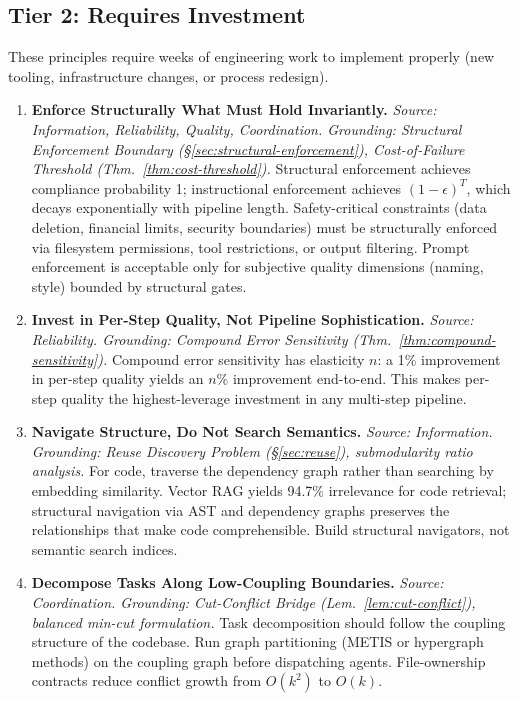 \documentclass[11pt, a4paper, logo, copyright]{googledeepmind}
\begin{document}
\subsection{Tier 2: Requires Investment}
\label{sec:tier2}

These principles require weeks of engineering work to implement properly (new tooling, infrastructure changes, or process redesign).

\begin{enumerate}[label=\textbf{P\arabic*.}, leftmargin=3em, resume]

\item \textbf{Enforce Structurally What Must Hold Invariantly.}
\emph{Source: Information, Reliability, Quality, Coordination. Grounding: Structural Enforcement Boundary (\S\ref{sec:structural-enforcement}), Cost-of-Failure Threshold (Thm.~\ref{thm:cost-threshold}).}
Structural enforcement achieves compliance probability 1; instructional enforcement achieves $(1-\epsilon)^T$, which decays exponentially with pipeline length. Safety-critical constraints (data deletion, financial limits, security boundaries) must be structurally enforced via filesystem permissions, tool restrictions, or output filtering. Prompt enforcement is acceptable only for subjective quality dimensions (naming, style) bounded by structural gates.

\item \textbf{Invest in Per-Step Quality, Not Pipeline Sophistication.}
\emph{Source: Reliability. Grounding: Compound Error Sensitivity (Thm.~\ref{thm:compound-sensitivity}).}
Compound error sensitivity has elasticity $n$: a 1\% improvement in per-step quality yields an $n$\% improvement end-to-end. This makes per-step quality the highest-leverage investment in any multi-step pipeline.

\item \textbf{Navigate Structure, Do Not Search Semantics.}
\emph{Source: Information. Grounding: Reuse Discovery Problem (\S\ref{sec:reuse}), submodularity ratio analysis.}
For code, traverse the dependency graph rather than searching by embedding similarity. Vector RAG yields 94.7\% irrelevance for code retrieval; structural navigation via AST and dependency graphs preserves the relationships that make code comprehensible. Build structural navigators, not semantic search indices.

\item \textbf{Decompose Tasks Along Low-Coupling Boundaries.}
\emph{Source: Coordination. Grounding: Cut-Conflict Bridge (Lem.~\ref{lem:cut-conflict}), balanced min-cut formulation.}
Task decomposition should follow the coupling structure of the codebase. Run graph partitioning (METIS or hypergraph methods) on the coupling graph before dispatching agents. File-ownership contracts reduce conflict growth from $O(k^2)$ to $O(k)$.


\end{enumerate}
\end{document}
